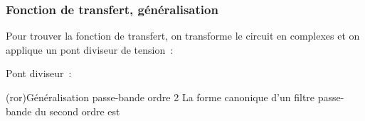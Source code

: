 \documentclass[../../main/main.tex]{subfiles}
\begin{document}
\subsubsection{Fonction de transfert, généralisation}
Pour trouver la fonction de transfert, on transforme le circuit en complexes et
on applique un pont diviseur de tension~:
\smallbreak
\noindent
\begin{minipage}[c]{.45\linewidth}
	\begin{center}
		\vspace{-15pt}
	\end{center}
\end{minipage}
\hfill
\begin{minipage}[c]{.5\linewidth}
	Pont diviseur~:
\end{minipage}
\begin{tcb*}(ror){Généralisation passe-bande ordre 2}
	La forme canonique d'un filtre passe-bande du second ordre est
	\psw{
		\[
			\boxed{\Hu(x) = \frac{H_0}{1 + \jj Q \left( x - \frac{1}{x} \right)}}
			\qav
			x = \frac{\w}{\w_0}
			\qet
			H_0 = \cte
			\qet
			Q \text{~ facteur de qualité}
		\]
	}
	\vspace{-15pt}
\end{tcb*}
\end{document}
